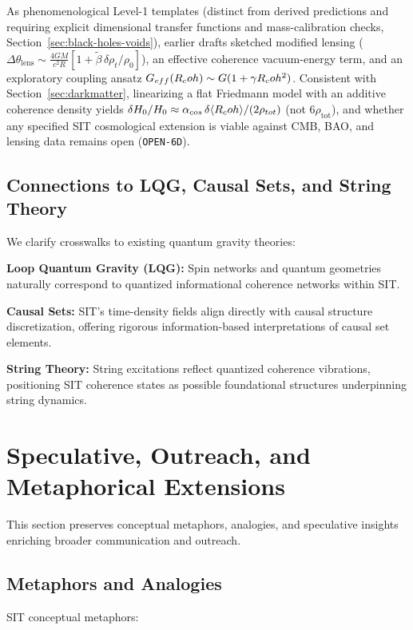 As phenomenological Level-1 templates (distinct from derived predictions and requiring explicit dimensional transfer functions and mass-calibration checks, Section~\ref{sec:black-holes-voids}), earlier drafts sketched modified lensing ($\Delta\theta_{\mathrm{lens}} \sim \frac{4GM}{c^2 R}[1 + \tilde{\beta}\,\delta\rho_t/\rho_0]$), an effective coherence vacuum-energy term, and an exploratory coupling ansatz $G_{eff}(R_coh) \sim G(1 + \gamma R_coh^2)$. Consistent with Section~\ref{sec:darkmatter}, linearizing a flat Friedmann model with an additive coherence density yields $\delta H_0/H_0 \approx \alpha_{cos}\,\delta\langle R_coh\rangle/(2\rho_{tot})$ (not $6\rho_{\mathrm{tot}}$), and whether any specified SIT cosmological extension is viable against CMB, BAO, and lensing data remains open (\texttt{OPEN-6D}).

\subsection{Connections to LQG, Causal Sets, and String Theory}

We clarify crosswalks to existing quantum gravity theories:

\textbf{Loop Quantum Gravity (LQG):} Spin networks and quantum geometries naturally correspond to quantized informational coherence networks within SIT.

\textbf{Causal Sets:} SIT's time-density fields align directly with causal structure discretization, offering rigorous information-based interpretations of causal set elements.

\textbf{String Theory:} String excitations reflect quantized coherence vibrations, positioning SIT coherence states as possible foundational structures underpinning string dynamics.

\section{Speculative, Outreach, and Metaphorical Extensions}
\label{app:speculative}

This section preserves conceptual metaphors, analogies, and speculative insights enriching broader communication and outreach.

\subsection{Metaphors and Analogies}

SIT conceptual metaphors:


